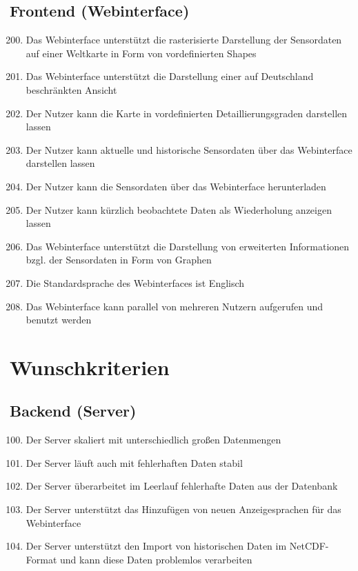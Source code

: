 \subsection{Frontend (Webinterface)}
\begin{enumerate}[label=\textbf{MK\arabic{enumi}0}]
	\setcounter{enumi}{199}
	\item Das Webinterface unterstützt die rasterisierte Darstellung der Sensordaten auf einer Weltkarte in Form von vordefinierten Shapes
	\item Das Webinterface unterstützt die Darstellung einer auf Deutschland beschränkten Ansicht
	\item Der Nutzer kann die Karte in vordefinierten Detaillierungsgraden darstellen lassen
	\item Der Nutzer kann aktuelle und historische Sensordaten über das Webinterface darstellen lassen
	\item Der Nutzer kann die Sensordaten über das Webinterface herunterladen
	\item Der Nutzer kann kürzlich beobachtete Daten als Wiederholung anzeigen lassen
	\item Das Webinterface unterstützt die Darstellung von erweiterten Informationen bzgl. der Sensordaten in Form von Graphen
	\item Die Standardsprache des Webinterfaces ist Englisch
	\item Das Webinterface kann parallel von mehreren Nutzern aufgerufen und benutzt werden
\end{enumerate}

\section{Wunschkriterien}
\subsection{Backend (Server)}
\begin{enumerate}[label=\textbf{WK\arabic{enumi}0}]
	\setcounter{enumi}{99}
	\item Der Server skaliert mit unterschiedlich großen Datenmengen
	\item Der Server läuft auch mit fehlerhaften Daten stabil
	\item Der Server überarbeitet im Leerlauf fehlerhafte Daten aus der Datenbank
	\item Der Server unterstützt das Hinzufügen von neuen Anzeigesprachen für das Webinterface
	\item \label{NetCDF_Import}Der Server unterstützt den Import von historischen Daten im NetCDF-Format und kann diese Daten problemlos verarbeiten
\end{enumerate}
